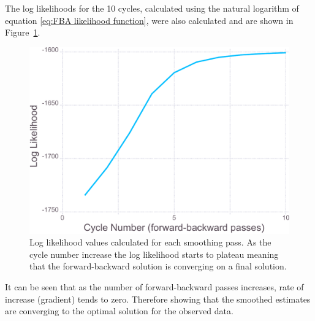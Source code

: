 The log likelihoods for the 10 cycles, calculated using the natural logarithm of equation \ref{eq:FBA likelihood function}, were also calculated and are shown in Figure~\ref{fig:Simulation Log likelihood - good}.
\begin{figure}[ht!]
    \centering
    \includegraphics[width=1.0\textwidth]{figures/datared/loglik.pdf}
    \caption[Log likelihood values calculated at the end of each smoothing pass for a strong reflection.]{Log likelihood values calculated for each smoothing pass.
    As the cycle number increase the log likelihood starts to plateau meaning that the forward-backward solution is converging on a final solution.}
    \label{fig:Simulation Log likelihood - good}
\end{figure}

It can be seen that as the number of forward-backward passes increases, rate of increase (gradient) tends to zero.
Therefore showing that the smoothed estimates are converging to the optimal solution for the observed data.

